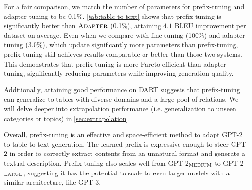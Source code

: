 \documentclass[11pt,a4paper]{article}
\newcommand{\exper}[1]{\textsc{#1}}
\newcommand{\adapter}{\exper{Adapter}}
\newcommand\pl[1]{\textcolor{red}{[PL: #1]}}
\newcommand\lisa[1]{\textcolor{blue}{[Lisa: #1]}}
\begin{document}
For a fair comparison, we match the number of parameters for prefix-tuning and adapter-tuning to be 0.1\%. \cref{tab:table-to-text} shows that prefix-tuning is significantly better than $\adapter$ (0.1\%), attaining $4.1$ BLEU improvement per dataset on average. 
Even when we compare with fine-tuning (100\%) and adapter-tuning (3.0\%),
which update significantly more parameters than prefix-tuning,
prefix-tuning still achieves results comparable or better than those two systems. 
This demonstrates that prefix-tuning is more Pareto efficient than adapter-tuning, significantly reducing parameters while improving generation quality. 

Additionally, attaining good performance on DART suggests that prefix-tuning can generalize to tables with diverse domains and a large pool of relations. We will delve deeper into extrapolation performance (i.e. generalization to unseen categories or topics) in \cref{sec:extrapolation}. 

Overall, prefix-tuning is an effective and space-efficient method to adapt GPT-2 to table-to-text generation. The learned prefix is expressive enough to steer GPT-2 in order to correctly extract contents from an unnatural format 
and generate a textual description. 
Prefix-tuning also scales well from GPT-2$_{\textsc{MEDIUM}}$ to GPT-2$_{\textsc{LARGE}}$, suggesting it has the potential to scale to even larger models with a similar architecture, like GPT-3. 
\end{document}
